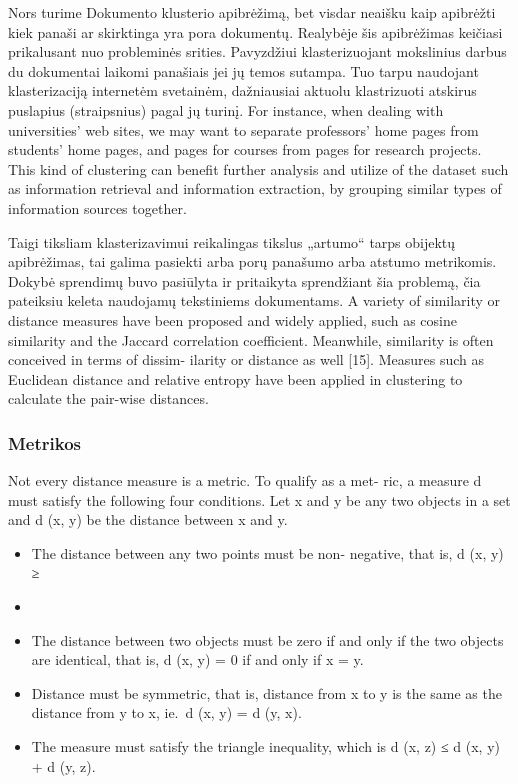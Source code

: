 \documentclass{VUMIFInfKursinis}
\begin{document}
Nors turime Dokumento klusterio apibrėžimą, bet visdar neaišku kaip apibrėžti kiek panaši ar skirktinga yra pora dokumentų. Realybėje šis apibrėžimas keičiasi prikalusant nuo probleminės srities. Pavyzdžiui klasterizuojant mokslinius darbus du dokumentai laikomi panašiais jei jų temos sutampa. Tuo tarpu naudojant klasterizaciją internetėm svetainėm, dažniausiai aktuolu klastrizuoti atskirus puslapius (straipsnius) pagal jų turinį.
For instance, when dealing with universities’ web sites, we may want to separate professors’ home pages from students’ home pages, and pages for courses from pages for research projects. This kind of clustering can benefit further analysis and utilize of the dataset such as information retrieval and information extraction, by grouping similar types of information sources together.

Taigi tiksliam klasterizavimui reikalingas tikslus „artumo“ tarps obijektų apibrėžimas, tai galima pasiekti arba porų panašumo arba atstumo metrikomis. Dokybė sprendimų buvo pasiūlyta ir pritaikyta sprendžiant šia problemą, čia pateiksiu keleta naudojamų tekstiniems dokumentams.
A variety of similarity or distance measures have been proposed and widely applied, such as cosine similarity and the Jaccard correlation coefficient.  Meanwhile, similarity is often conceived in terms of dissim- ilarity or distance as well [15]. Measures such as Euclidean distance and relative entropy have been applied in clustering to calculate the pair-wise distances.

\subsubsection{Metrikos}
Not every distance measure is a metric. To qualify as a met- ric, a measure d must satisfy the following four conditions.  Let x and y be any two objects in a set and d (x, y) be the distance between x and y.
\begin{itemize}
	\item The distance between any two points must be non- negative, that is, d (x, y) ≥ \item
	\item The distance between two objects must be zero if and only if the two objects are identical, that is, d (x, y) = 0 if and only if x = y.
	\item Distance must be symmetric, that is, distance from x to y is the same as the distance from y to x, ie.\  d (x, y) = d (y, x).
	\item The measure must satisfy the triangle inequality, which is d (x, z) ≤ d (x, y) + d (y, z).
\end{itemize}
\end{document}
